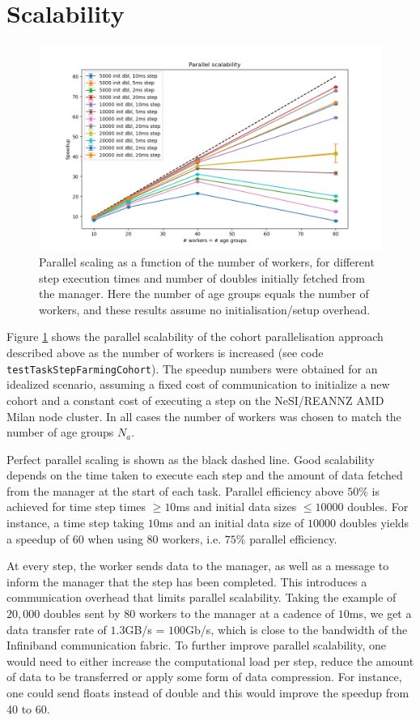 \documentclass[a4paper,oneside,12pt]{article}
\begin{document}
\section{Scalability}

\begin{figure}
    \includegraphics[width=15cm]{results/speedup_vs_workers.png}
    \caption{Parallel scaling as a function of the number of workers, for different step execution 
    times and number of doubles initially fetched from the manager. 
    Here the number of age groups equals the number of workers, and these results 
    assume no initialisation/setup overhead.}
    \label{fig:speedup}
\end{figure}

Figure \ref{fig:speedup} shows the parallel scalability of the cohort parallelisation 
approach described above as the number of workers is increased (see code \verb|testTaskStepFarmingCohort|). 
The speedup numbers were obtained for an idealized scenario, assuming 
a fixed cost of communication to initialize a new cohort and a constant cost of executing a step
on the NeSI/REANNZ AMD Milan node cluster.
In all cases the number of workers was chosen to match the number of age groups $N_a$.

Perfect parallel scaling 
is shown as the black dashed line. Good scalability depends on the time taken to execute 
each step and the amount of data fetched from the manager at the start of each task. Parallel 
efficiency above $50\%$ is achieved for time step times $\geq 10$ms and initial data sizes 
$\leq 10000$ doubles. For instance, a time step taking $10$ms and an initial data size of 
$10000$ doubles yields a speedup of 60 when using $80$ workers, i.e. $75\%$ parallel efficiency.

At every step, the worker sends data to the manager, as well as a message 
to inform the manager that the step has been completed. This introduces a communication overhead
that limits parallel scalability. 
Taking the example of $20,000$ doubles sent by 80 workers to the manager at a cadence of 
 $10$ms, we get a data transfer rate of $1.3$GB/s = $100$Gb/s, which is close to the bandwidth 
 of the Infiniband communication fabric. To further improve parallel scalability, one would need to 
 either increase the computational load per step, reduce the amount of data to be transferred or apply
some form of data compression. For instance, one could send floats instead of double and this would 
improve the speedup from 40 to 60. 
\end{document}
